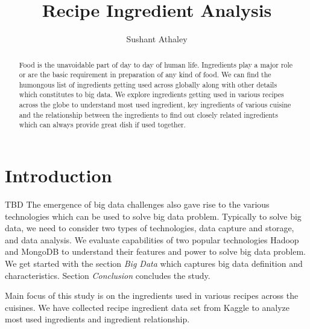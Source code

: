 \documentclass[sigconf]{acmart}
\begin{document}
\title{Recipe Ingredient Analysis}


\author{Sushant Athaley}

\renewcommand{\shortauthors}{G. v. Laszewski}


\begin{abstract}
Food is the unavoidable part of day to day of human life. Ingredients play a major role or are the basic requirement in preparation of any kind of food. We can find the humongous list of ingredients getting used across globally along with other details which constitutes to big data. We explore ingredients getting used in various recipes across the globe to understand most used ingredient, key ingredients of various cuisine and the relationship between the ingredients to find out closely related ingredients which can always provide great dish if used together.
\end{abstract}


\maketitle

\section{Introduction}
TBD
The emergence of big data challenges also gave rise to the various technologies which can be used to solve big data problem. Typically to solve big data, we need to consider two types of technologies, data capture and storage, and data analysis. We evaluate capabilities of two popular technologies Hadoop and MongoDB to understand their features and power to solve big data problem. We get started with the section \emph{Big Data} which captures big data definition and characteristics. Section \emph{Conclusion} concludes the study. 

Main focus of this study is on the ingredients used in various recipes across the cuisines. We have collected recipe ingredient data set from Kaggle \cite{www-kaggle} to analyze most used ingredients and ingredient relationship.
\end{document}
